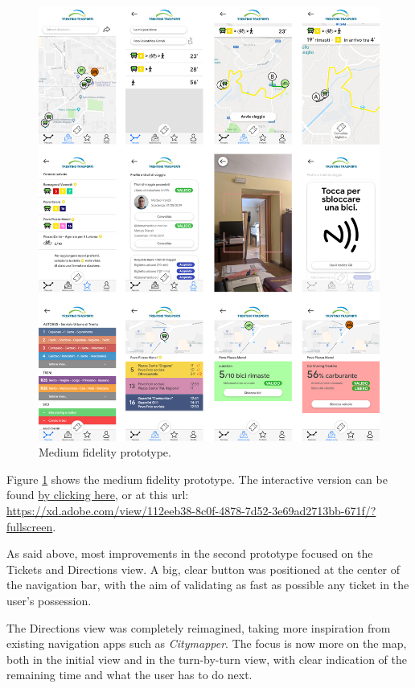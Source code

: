 \documentclass[11pt]{article}
\begin{document}
\begin{figure}[p]
    \centering
    \includegraphics[width=\textwidth]{drawable/medfid/uniti}
    \caption{Medium fidelity prototype.}
    \label{fig:medfid}
\end{figure}

Figure \ref{fig:medfid}  shows the medium fidelity prototype. The interactive version can be found \href{https://xd.adobe.com/view/112eeb38-8c0f-4878-7d52-3e69ad2713bb-671f/?fullscreen}{by clicking here}, or at this url:\\\url{https://xd.adobe.com/view/112eeb38-8c0f-4878-7d52-3e69ad2713bb-671f/?fullscreen}.

As said above, most improvements in the second prototype focused on the Tickets and Directions view. A big, clear button was positioned at the center of the navigation bar, with the aim of validating as fast as possible any ticket in the user's possession.

The Directions view was completely reimagined, taking more inspiration from existing navigation apps such as \textit{Citymapper}. The focus is now more on the map, both in the initial view and in the turn-by-turn view, with clear indication of the remaining time and what the user has to do next.
\end{document}
